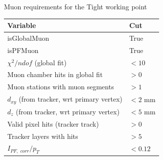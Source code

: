 \begin{frame}{Muon requirements for the Tight working point}
\begin{center}
\small
\begin{tabular}{|l|l|}
\hline
Variable & Cut  \\
\hline
isGlobalMuon & True \\
isPFMuon & True \\
$\chi^2 / ndof$ (global fit) & $<10$ \\
Muon chamber hits in global fit & $>0$ \\
Muon stations with muon segments & $>1$ \\
$d_{xy}$ (from tracker, wrt primary vertex) & $< 2$ mm  \\
$d_z$ (from tracker, wrt primary vertex) & $< 5$ mm  \\
Valid pixel hits (tracker track) & $> 0$ \\
Tracker layers with hits & $>5$ \\
$I_{PF, \,\, corr}/p_T$ & $< 0.12$ \\
\hline
\end{tabular}

\end{center}
\end{frame}



